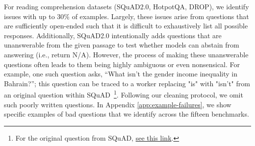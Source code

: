 For reading comprehension datasets (SQuAD2.0, HotpotQA, DROP), we identify issues with up to 30\% of examples. Largely, these issues arise from questions that are sufficiently open-ended such that it is difficult to exhaustively list all possible responses. Additionally, SQuAD2.0 intentionally adds questions that are unanswerable from the given passage to test whether models can abstain from answering (i.e., return N/A). However, the process of making these unanswerable questions often leads to them being highly ambiguous or even nonsensical. For example, one such question asks, ``What isn't the gender income inequality in Bahrain?''; this question can be traced to a worker replacing "is" with "isn't" from an original question within SQuAD~\cite{rajpurkar2016squad}\footnote{For the original question from SQuAD, \href{https://huggingface.co/datasets/rajpurkar/squad/viewer/plain\_text/validation?p=74&row=7464}{see this link}.}. Following our cleaning protocol, we omit such poorly written questions.
In Appendix \ref{app:example-failures}, we show specific examples of bad questions that we identify across the fifteen benchmarks.




